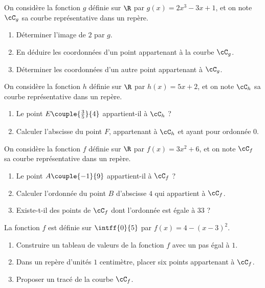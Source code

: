 \exo

On considère la fonction $g$ définie sur $\R$ par $g(x)=2x^3-3x+1$, et on note $\cC_g$ sa courbe représentative dans un repère.
\begin{enumerate}
\item Déterminer l'image de $2$ par $g$.
\item En déduire les coordonnées d'un point appartenant à la courbe $\cC_g$.
\item Déterminer les coordonnées d'un autre point appartenant à $\cC_g$.
\end{enumerate}

\exo

On considère la fonction $h$ définie sur $\R$ par $h(x)=5x+2$, et on note $\cC_h$ sa courbe représentative dans un repère.
\begin{enumerate}
\item Le point $E\couple{\frac{3}{5}}{4}$ appartient-il à $\cC_h$ ?
\item Calculer l'abscisse du point $F$, appartenant à $\cC_h$ et ayant pour ordonnée $0$.
\end{enumerate}

\exo

On considère la fonction $f$ définie sur $\R$ par $f(x)=3x^2+6$, et on note $\cC_f$ sa courbe représentative dans un repère.
\begin{enumerate}
\item Le point $A\couple{-1}{9}$ appartient-il à $\cC_f$ ?
\item Calculer l'ordonnée du point $B$ d'abscisse $4$ qui appartient à $\cC_f$.
\item Existe-t-il des points de $\cC_f$ dont l'ordonnée est égale à $33$ ?
\end{enumerate}

\exo

La fonction $f$ est définie sur $\intff{0}{5}$ par $f(x)=4-(x-3)^2$.
\begin{enumerate}
\item Construire un tableau de valeurs de la fonction $f$ avec un pas égal à $1$.
\item Dans un repère d'unités $1$ centimètre, placer six points appartenant à $\cC_f$.
\item Proposer un tracé de la courbe $\cC_f$.
\end{enumerate}


\exo

